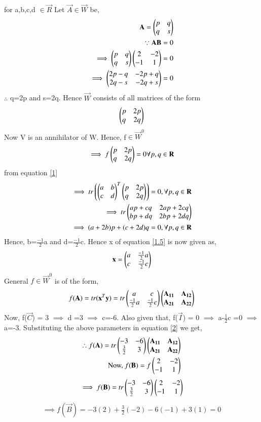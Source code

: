 \documentclass[journal,12pt,twocolumn]{IEEEtran}
\begin{document}
for a,b,c,d $\in\vec{R}$
Let $\vec{A} \in \vec{W}$ be,
\begin{align}
\mathbf{A} = \begin{pmatrix}p&q\\q&s\end{pmatrix}\\
\because \mathbf{AB} = 0\\
\implies \begin{pmatrix}p&q\\q&s\end{pmatrix}\begin{pmatrix}2&-2\\-1&1\end{pmatrix} = 0\\
\implies \begin{pmatrix}2p-q&-2p+q\\2q-s&-2q+s\end{pmatrix} = 0
\end{align}
$\therefore$ q=2p and s=2q.
Hence $\vec{W}$ consists of all matrices of the form 
\begin{align}
\begin{pmatrix}p&2p\\q&2q\end{pmatrix}
\end{align}
Now V is an annihilator of W. Hence, f$\in\vec{W}^0$
\begin{align}
\implies f\begin{pmatrix}p&2p\\q&2q\end{pmatrix} = 0 \forall p,q \in \mathbf{R}
\end{align}
from equation \eqref{1}
\begin{align}
\implies tr\left(\begin{pmatrix}a&b\\c&d\end{pmatrix}^T \begin{pmatrix}p&2p\\q&2q\end{pmatrix}\right) = 0, \forall p,q \in \mathbf{R}\\
\implies tr\begin{pmatrix}ap+cq&2ap+2cq\\bp+dq&2bp+2dq\end{pmatrix}\\
\implies (a+2b)p + (c+2d)q = 0, \forall p,q \in \mathbf{R}
\end{align}
Hence, b=$\frac{-1}{2}$a and d=$\frac{-1}{2}$c. Hence x of equation \eqref{1.5} is now given as,
\begin{align}
\mathbf{x}= \begin{pmatrix}a&\frac{-1}{2}a\\c&\frac{-1}{2}c\end{pmatrix}
\end{align}  
General $f\in\vec{W}^0$ is of the form,
\begin{align}
f(\mathbf{A}) = tr(\mathbf{x}^T\mathbf{y}) = tr\begin{pmatrix}a&c\\\frac{-1}{2}a&\frac{-1}{2}c\end{pmatrix}\begin{pmatrix}\mathbf{A_{11}}&\mathbf{A_{12}}\\\mathbf{A_{21}}&\mathbf{A_{22}}\end{pmatrix}
\label{2}
\end{align}
Now, f($\vec{C}$) = 3 $\implies$ d =3 $\implies$ c=-6. Also given that, f($\vec{I}$) = 0 $\implies$ a-$\frac{1}{2}$c =0 $\implies$ a=-3. Substituting the above parameters in equation \eqref{2} we get,
\begin{align}
\therefore f(\mathbf{A}) = tr\begin{pmatrix}-3&-6\\\frac{3}{2}&3\end{pmatrix}\begin{pmatrix}\mathbf{A_{11}}&\mathbf{A_{12}}\\\mathbf{A_{21}}&\mathbf{A_{22}}\end{pmatrix} \\
\mbox{Now, } f(\mathbf{B}) = f\begin{pmatrix}2&-2\\-1&1\end{pmatrix} 
\end{align}
\begin{align}
\implies f(\mathbf{B}) = tr\begin{pmatrix}-3&-6\\\frac{3}{2}&3\end{pmatrix}\begin{pmatrix}2&-2\\-1&1\end{pmatrix} 
\end{align}
\begin{align}
\implies f(\vec{B}) = -3(2)+\frac{3}{2}(-2)-6(-1)+3(1) = 0 
\end{align}
\end{document}
